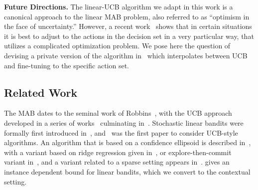 \documentclass{article}
\renewcommand{\paragraph}[1]{\vspace{2pt}\noindent\textbf{#1}}
\begin{document}
\paragraph{Future Directions.} The linear-UCB algorithm we adapt in this work is a canonical approach to the linear MAB problem, also referred to as ``optimism in the face of uncertainty.'' However, a recent work~\cite{LattimoreS17} shows that in certain situations it is best to adjust to the actions in the decision set in a very particular way, that utilizes a complicated optimization problem. We pose here the question of devising a private version of the algorithm in~\cite{LattimoreS17} which interpolates between UCB and fine-tuning to the specific action set. 
\vspace{-0.5mm}
\subsection{Related Work}
\label{subsec:related_work}
The MAB dates to the seminal work of Robbins~\cite{robbins1952}, with the UCB approach developed in a series of works~\cite{BanditBook85,Agrawal95} culminating in~\cite{Auer2002}.  Stochastic linear bandits were formally first introduced in~\cite{Abe2003}, and~\cite{Auer2003UCB} was the first paper to consider UCB-style algorithms. An algorithm that is based on a confidence ellipsoid is described in~\cite{DaniStochasticLinearOptimization2008}, with a variant based on ridge regression given in~\cite{ChuLRS11}, or explore-then-commit variant in~\cite{RusmevichientongT10}, and a variant related to a sparse setting appears in~\cite{Abbasi-YadkoriPS12}. \cite{AbbasiYadkoriImprovedAlgorithmsLinear2011} gives an instance dependent bound for linear bandits, which we convert to the contextual setting.
\end{document}
